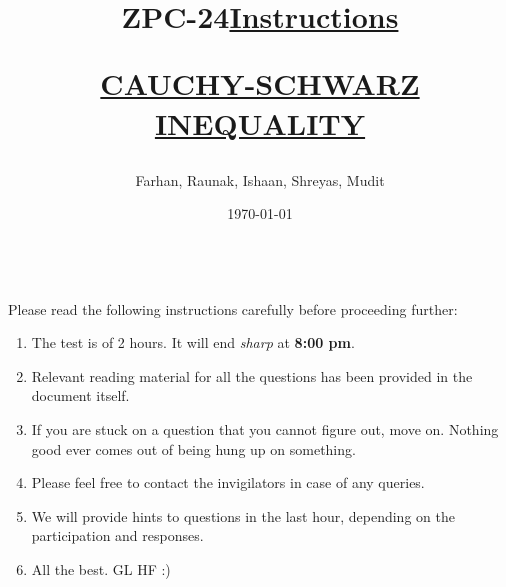 \documentclass[12pt]{article}
\title{ZPC-24}
\author{Farhan, Raunak, Ishaan, Shreyas, Mudit}
\date{\today}
\begin{document}
\maketitle
\title{\textbf{\underline{\fontsize{18}{12}\selectfont Instructions}}}\\
Please read the following instructions carefully before proceeding further:\\
\begin{enumerate}
\item The test is of 2 hours. It will end \textit{sharp} at \textbf{8:00 pm}.
\item Relevant reading material for all the questions has been provided in the document itself.
\item If you are stuck on a question that you cannot figure out, move on. Nothing good ever comes out of being hung up on something.
\item Please feel free to contact the invigilators in case of any queries.
\item We will provide hints to questions in the last hour, depending on the participation and responses.
\item All the best. GL HF :)\\
\end{enumerate}
\bigskip
\maketitle
\newpage
\title{\begin{center}\textbf{\underline{\fontsize{16}{12}\selectfont CAUCHY-SCHWARZ INEQUALITY}}\end{center}}
\end{document}
